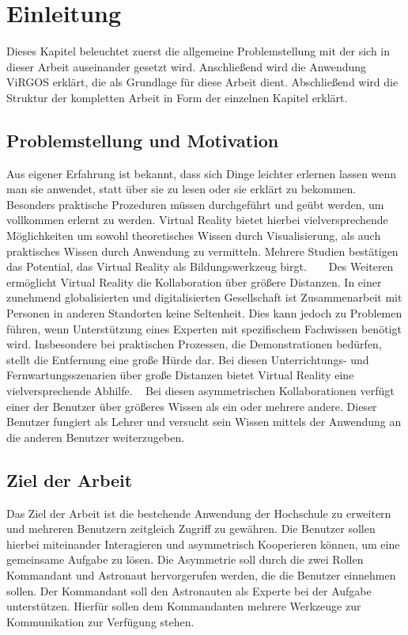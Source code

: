 ﻿\section{Einleitung}
Dieses Kapitel beleuchtet zuerst die allgemeine Problemstellung mit der sich in dieser Arbeit auseinander gesetzt wird. Anschließend wird die Anwendung ViRGOS erklärt, die als Grundlage für diese Arbeit dient. Abschließend wird die Struktur der kompletten Arbeit in Form der einzelnen Kapitel erklärt.

\subsection{Problemstellung und Motivation} \label{Problemstellung}
Aus eigener Erfahrung ist bekannt, dass sich Dinge leichter erlernen lassen wenn man sie anwendet, statt über sie zu lesen oder sie erklärt zu bekommen. Besonders praktische Prozeduren müssen durchgeführt und geübt werden, um vollkommen erlernt zu werden. Virtual Reality bietet hierbei vielversprechende Möglichkeiten um sowohl theoretisches Wissen durch Visualisierung, als auch praktisches Wissen durch Anwendung zu vermitteln. Mehrere Studien bestätigen das Potential, das Virtual Reality als Bildungswerkzeug birgt. ~\parencite{8864531} ~\parencite{8797755} Des Weiteren ermöglicht Virtual Reality die Kollaboration über größere Distanzen. In einer zunehmend globalisierten und digitalisierten Gesellschaft ist Zusammenarbeit mit Personen in anderen Standorten keine Seltenheit. Dies kann jedoch zu Problemen führen, wenn Unterstützung eines Experten mit spezifischem Fachwissen benötigt wird. Insbesondere bei praktischen Prozessen, die Demonstrationen bedürfen, stellt die Entfernung eine große Hürde dar. Bei diesen Unterrichtungs- und Fernwartungsszenarien über große Distanzen bietet Virtual Reality eine vielversprechende Abhilfe. ~\parencite{10.1145/2807442.2807497} Bei diesen asymmetrischen Kollaborationen verfügt einer der Benutzer über größeres Wissen als ein oder mehrere andere. Dieser Benutzer fungiert als Lehrer und versucht sein Wissen mittels der Anwendung an die anderen Benutzer weiterzugeben. \\
 

\subsection{Ziel der Arbeit}

Das Ziel der Arbeit ist die bestehende Anwendung der Hochschule zu erweitern und mehreren Benutzern zeitgleich Zugriff zu gewähren. Die Benutzer sollen hierbei miteinander Interagieren und asymmetrisch Kooperieren können, um eine gemeinsame Aufgabe zu lösen. Die Asymmetrie soll durch die zwei Rollen Kommandant und Astronaut hervorgerufen werden, die die Benutzer einnehmen sollen. Der Kommandant soll den Astronauten als Experte bei der Aufgabe unterstützen. Hierfür sollen dem Kommandanten mehrere Werkzeuge zur Kommunikation zur Verfügung stehen. \\

